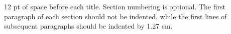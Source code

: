 \documentclass[12pt]{article}
\begin{document}
12 pt of space before each title. Section numbering is optional. The first
paragraph of each section should not be indented, while the first lines of
subsequent paragraphs should be indented by 1.27 cm.









\end{document}
